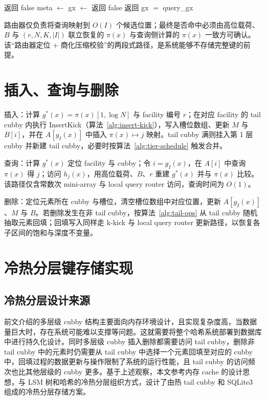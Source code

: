 \begin{algorithm}[htbp]
  \caption{SlotPiMatches：槽位命中校验}
  \label{alg:slot-match}
  \begin{algorithmic}[1]
       \State 返回 false \EndIf
      \State meta $\gets$ 
      \State gx $\gets$ 
       \State 返回 false \EndIf
      \State 返回 gx $=$ query\_gx
    \EndFunction
  \end{algorithmic}
\end{algorithm}

路由器仅负责将查询映射到 \(O(I)\) 个候选位置；最终是否命中必须由高位载荷、\(B\) 与 \((r,N,K,|I|)\) 联立恢复的 \(\pi(x)\) 与查询侧计算的 \(\pi(x)\) 一致方可确认。该“路由器定位 + 商化压缩校验”的两段式路径，是系统能够不存储完整键的前提\cite{bender2022otsh,pagh2008retrieval}。

\section{插入、查询与删除}

插入：计算 \(g^\ast(x)=\pi(x)[1,\log N]\) 与 facility 编号 \(r\)；在对应 facility 的 tail cubby 内执行 InsertKick（算法~\ref{alg:insert-kick}），写入槽位数组、更新 \(M\) 与 \(B[i]\)，并在 \(A[g_I(x)]\) 中插入 \(\pi(x)\mapsto j\) 映射。tail cubby 满则挂入第 1 层 cubby 并新建 tail cubby，必要时按算法~\ref{alg:tier-schedule} 触发合并\cite{bender2022otsh}。

查询：计算 \(g^\ast(x)\) 定位 facility 与 cubby；令 \(i=g_I(x)\)，在 \(A[i]\) 中查询 \(\pi(x)\) 得 \(j\)；访问 \(h_j(x)\)，用高位载荷、\(B\)、\(r\) 重建 \(g^\ast(x)\) 并与 \(\pi(x)\) 比较。该路径仅含常数次 mini-array 与 local query router 访问，查询时间为 \(O(1)\)\cite{bender2022otsh}。

删除：定位元素所在 cubby 与槽位，清空槽位数组中对应位置，更新 \(A[g_I(x)]\)、\(M\) 与 \(B\)。若删除发生在非 tail cubby，按算法~\ref{alg:tail-ops} 从 tail cubby 随机抽取元素回填；回填写入同样走 k-kick 与 local query router 更新路径，以恢复各子区间的饱和与深度不变量。

\section{冷热分层键存储实现}

\subsection{冷热分层设计来源}
前文介绍的多层级 cubby 结构主要面向内存环境设计，且实现复杂度高，当数据量巨大时，存在系统可能难以支撑等问题。这就需要将整个哈希系统部署到数据库中进行持久化设计。同时多层级 cubby 插入删除都需要访问 tail cubby，删除非 tail cubby 中的元素时仍需要从 tail cubby 中选择一个元素回填至对应的 cubby 中，回填过程的数据更新与操作限制了系统的运行性能，且 tail cubby 的访问频次也比其他层级的 cubby 更多。基于上述观察，本文参考内存 cache 的设计思想，与 LSM 树和哈希的冷热分层组织方式，设计了由热 tail cubby 和 SQLite3 组成的冷热分层存储方案。

